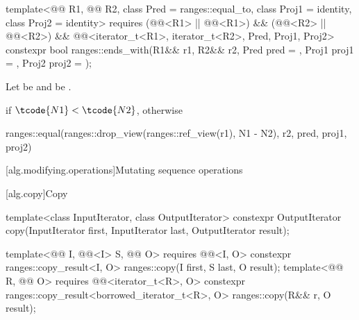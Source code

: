 \begin{itemdecl}
template<@@ R1, @@ R2, class Pred = ranges::equal_to, class Proj1 = identity,
         class Proj2 = identity>
  requires (@@<R1> || @@<R1>) &&
           (@@<R2> || @@<R2>) &&
           @@<iterator_t<R1>, iterator_t<R2>, Pred, Proj1, Proj2>
  constexpr bool ranges::ends_with(R1&& r1, R2&& r2, Pred pred = {},
                                   Proj1 proj1 = {}, Proj2 proj2 = {});
\end{itemdecl}

\begin{itemdescr}
\pnum
Let  be  and
 be .

\pnum
\returns
{} if $\tcode{N1} < \tcode{N2}$, otherwise
\begin{codeblock}
ranges::equal(ranges::drop_view(ranges::ref_view(r1), N1 - N2), r2, pred, proj1, proj2)
\end{codeblock}
\end{itemdescr}

[alg.modifying.operations]{Mutating sequence operations}

[alg.copy]{Copy}

%
\begin{itemdecl}
template<class InputIterator, class OutputIterator>
  constexpr OutputIterator copy(InputIterator first, InputIterator last,
                                OutputIterator result);

template<@@ I, @@<I> S, @@ O>
  requires @@<I, O>
  constexpr ranges::copy_result<I, O> ranges::copy(I first, S last, O result);
template<@@ R, @@ O>
  requires @@<iterator_t<R>, O>
  constexpr ranges::copy_result<borrowed_iterator_t<R>, O> ranges::copy(R&& r, O result);
\end{itemdecl}

